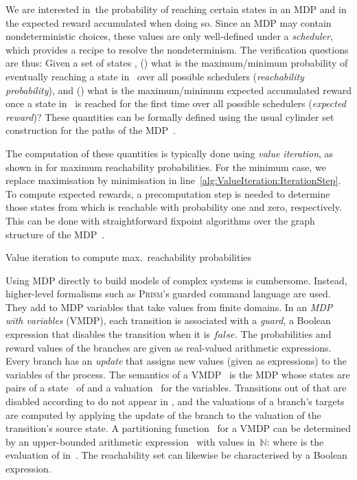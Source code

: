 \documentclass{llncs}
\newcommand{\prism}{\textsc{Prism}\xspace}
\newcommand{\NN}{\ensuremath{\mathbb{N}}\xspace}
\newcommand{\False}[0]{\ensuremath{\mathit{false}}\xspace}
\begin{document}
We are interested in~the probability of reaching certain states in an MDP and in the expected reward  accumulated when doing so.
Since an MDP may contain nondeterministic choices, these values are only well-defined under a \emph{scheduler}, which provides a recipe to resolve the nondeterminism.
The verification questions are thus:
Given a set of states ,
() what is the maximum/minimum probability of eventually reaching a state in~ over all possible schedulers (\emph{reachability probability}), and
() what is the maximum/minimum expected accumulated reward once a state in~ is reached for the first time over all possible schedulers (\emph{expected reward})?
These quantities can be formally defined using the usual cylinder set construction for the paths of the MDP~\cite{FKNP11}.

The computation of these quantities is typically done using \emph{value iteration}, as shown in  for maximum reachability probabilities.
For the minimum case, we replace maximisation by minimisation in line~\ref{alg:ValueIteration:IterationStep}.
To compute expected rewards, a precomputation step is needed to determine those states from which  is reachable with probability one and zero, respectively.
This can be done with straightforward fixpoint algorithms over the graph structure of the MDP~\cite{FKNP11}.

\begin{algorithm}[tp]
  \Repeat{}{
    \;
    \ForEach{}{
      \;\label{alg:ValueIteration:IterationStep}
      \lIf{}{\label{alg:MDPExhaustiveMCValueIteration:ErrorLine}}
      \;
    }
  }
  \Return{}
\caption{\small Value iteration to compute max.\ reachability probabilities}
\label{alg:ValueIteration}
\end{algorithm}

Using MDP directly to build models of complex systems is cumbersome.
Instead, higher-level formalisms such as \prism's guarded command language are used.
They add  to MDP variables that take values from finite domains.
In an \emph{MDP with variables} (VMDP),
each transition is associated with a \emph{guard}, a Boolean expression that disables the transition when it is \False.
The probabilities and reward values of the branches are given as real-valued arithmetic expressions.
Every branch has an \emph{update} that assigns new values (given as expressions) to the variables of the process.
The semantics of a VMDP~ is the MDP  whose states are pairs  of a state~ of  and a valuation~ for the variables.
Transitions out of  that are disabled according to  do not appear in , and the valuations of a branch's targets are computed by applying the update of the branch to the valuation of the transition's source state.
 A partitioning function~ for a VMDP can be determined by an upper-bounded arithmetic expression~ with values in~\NN:  where  is the evaluation of  in~.
The reachability set  can likewise be characterised by a Boolean expression.
\end{document}
